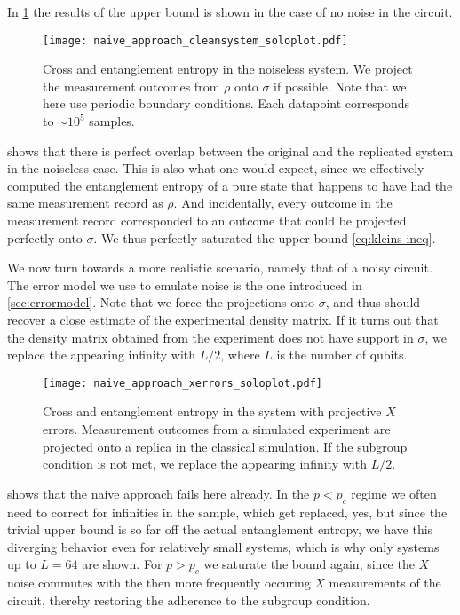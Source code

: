 In \cref{fig:naive-svn-vs-se-no-error} the results of the upper bound is shown
in the case of no noise in the circuit.
\begin{figure}[t]
  \centering
  \texttt{[image: naive\_approach\_cleansystem\_soloplot.pdf]}
  \caption{Cross and entanglement entropy in the noiseless system. We project
    the measurement outcomes from $\rho$ onto $\sigma$ if possible. Note that
    we here use periodic boundary conditions. Each datapoint corresponds to
    $\sim 10^5$ samples.}
  \label{fig:naive-svn-vs-se-no-error}
\end{figure}
 shows that there is perfect overlap between the original and
the replicated system in the noiseless case. This is also what one would
expect, since we effectively computed the entanglement entropy of a pure state that
happens to have had the same measurement record as $\rho$. And incidentally,
every outcome in the measurement record corresponded to an outcome that could
be projected perfectly onto $\sigma$. We thus perfectly saturated the upper
bound \cref{eq:kleins-ineq}. 

We now turn towards a more realistic scenario, namely that of a noisy circuit.
The error model we use to emulate noise is the one introduced in
\cref{sec:errormodel}. Note that we force the projections onto $\sigma$, and
thus should recover a close estimate of the experimental density matrix. If it
turns out that the density matrix obtained from the experiment does not have
support in $\sigma$, we replace the appearing infinity with $L /2$, where $L$
is the number of qubits.
\begin{figure}[t]
  \centering
  \texttt{[image: naive\_approach\_xerrors\_soloplot.pdf]}
  \caption{Cross and entanglement entropy in the system with projective $X$
  errors. Measurement outcomes from a simulated experiment are projected onto a
replica in the classical simulation. If the subgroup condition is not met, we
replace the appearing infinity with $L /2$. }
  \label{fig:naive-svn-vs-se}
\end{figure}

 shows that the naive approach fails here already. In
the $p< p_c$ regime we often need to correct for infinities in the sample,
which get replaced, yes, but since the trivial upper bound is so far off the
actual entanglement entropy, we have this diverging behavior even for
relatively small systems, which is why only systems up to $L=64$ are shown. For
$p>p_c$ we saturate the bound again, since the $X$ noise commutes with the then
more frequently occuring $X$ measurements of the circuit, thereby restoring the
adherence to the subgroup condition.

